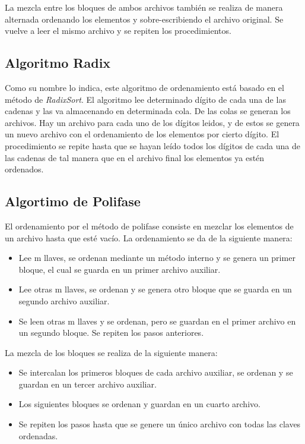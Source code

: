 \documentclass{article}
\begin{document}
		La mezcla entre los bloques de ambos archivos también se realiza de manera alternada ordenando los elementos y sobre-escribiendo el archivo original. Se vuelve a leer el mismo archivo
		y se repiten los procedimientos.
		
		\subsection{Algoritmo Radix}
		Como su nombre lo indica, este algoritmo de ordenamiento está basado en el método de \textit{RadixSort}. El algoritmo lee determinado dígito de cada una de las cadenas y las
		va almacenando en determinada cola. De las colas se generan los archivos. Hay un archivo para cada uno de los dígitos leidos, y de estos se genera un nuevo archivo con el ordenamiento
		de los elementos por cierto dígito. El procedimiento se repite hasta que se hayan leído todos los dígitos de cada una de las cadenas de tal manera que en el archivo final los elementos ya
		estén ordenados.
		
		\subsection{Algortimo de Polifase}
		El ordenamiento por el método de polifase consiste en mezclar los elementos de un archivo hasta que esté vacío.
		La ordenamiento se da de la siguiente manera:
		
		\begin{itemize}
			\item Lee m llaves, se ordenan mediante un método interno y se genera un primer bloque, el cual se guarda en un primer archivo auxiliar.
			\item Lee otras m llaves, se ordenan y se genera otro bloque que se guarda en un segundo archivo auxiliar.
			\item Se leen otras m llaves y se ordenan, pero se guardan en el primer archivo en un segundo bloque. Se repiten los pasos anteriores.
		\end{itemize} 
		
		La mezcla de los bloques se realiza de la siguiente manera:
		
		\begin{itemize}
			\item Se intercalan los primeros bloques de cada archivo auxiliar, se ordenan y se guardan en un tercer archivo auxiliar.
			\item Los siguientes bloques se ordenan y guardan en un cuarto archivo.
			\item Se repiten los pasos hasta que se genere un único archivo con todas las claves ordenadas.
		\end{itemize}
	
\end{document}
